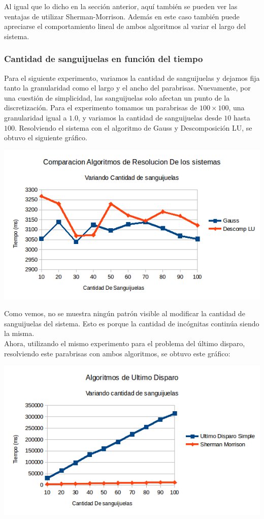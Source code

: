 Al igual que lo dicho en la sección anterior, aquí también se pueden ver las ventajas de utilizar Sherman-Morrison. Además en este caso también puede apreciarse el comportamiento lineal de ambos algoritmos al variar el largo del sistema.

\subsubsection{Cantidad de sanguijuelas en función del tiempo}
Para el siguiente experimento, variamos la cantidad de sanguijuelas y dejamos fija tanto la granularidad como el largo y el ancho del parabrisas. Nuevamente, por una cuestión de simplicidad, las sanguijuelas solo afectan un punto de la discretización. Para el experimento tomamos un parabrisas de $100 \times 100$, una granularidad igual a $1.0$, y variamos la cantidad de sanguijuelas desde $10$ hasta $100$. Resolviendo el sistema con el algoritmo de Gauss y Descomposición LU, se obtuvo el siguiente gráfico.

\begin{center}
 \includegraphics[width=400pt]{imagenes/testeo/sangGauss.png}
\end{center}

Como vemos, no se muestra ningún patrón visible al modificar la cantidad de sanguijuelas del sistema. Esto es porque la cantidad de incógnitas continúa siendo la misma.
\\
Ahora, utilizando el mismo experimento para el problema del último disparo, resolviendo este parabrisas con ambos algoritmos, se obtuvo este gráfico:

\begin{center}
 \includegraphics[width=400pt]{imagenes/testeo/sangSalv.png}
\end{center}

